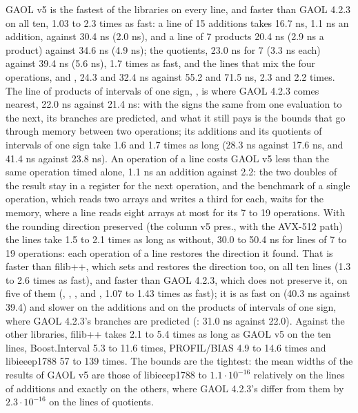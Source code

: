 GAOL v5 is the fastest of the libraries on every line, and faster than GAOL
4.2.3 on all ten, 1.03 to 2.3 times as fast: a line of 15 additions takes
16.7 ns, 1.1 ns an addition, against 30.4 ns (2.0 ns), and a line of 7
products 20.4 ns (2.9 ns a product) against 34.6 ns (4.9 ns); the quotients,
23.0 ns for 7 (3.3 ns each) against 39.4 ns (5.6 ns), 1.7 times as fast, and
the lines that mix the four operations,  and ,
24.3 and 32.4 ns against 55.2 and 71.5 ns, 2.3 and 2.2 times. The line of
products of intervals of one sign, , is where GAOL 4.2.3
comes nearest, 22.0 ns against 21.4 ns: with the signs the same from one
evaluation to the next, its branches are predicted, and what it still pays
is the bounds that go through memory between two operations; its additions
and its quotients of intervals of one sign take 1.6 and 1.7 times as long
(28.3 ns against 17.6 ns, and 41.4 ns against 23.8 ns). An operation of a
line costs GAOL v5 less than the same operation timed alone, 1.1 ns an
addition against 2.2: the two doubles of the result stay in a register for
the next operation, and the benchmark of a single operation, which reads two
arrays and writes a third for each, waits for the memory, where a line reads
eight arrays at most for its 7 to 19 operations. With the rounding direction
preserved (the column v5 pres.,  with the
AVX-512 path) the lines take 1.5 to 2.1 times as long as without, 30.0 to
50.4 ns for lines of 7 to 19 operations: each operation of a line restores
the direction it found. That is faster than filib++, which sets and
restores the direction too, on all ten lines (1.3 to 2.6 times as fast), and
faster than GAOL 4.2.3, which does not preserve it, on five of them
(, , ,  and
, 1.07 to 1.43 times as fast); it is as fast on 
(40.3 ns against 39.4) and slower on the additions and on the products of
intervals of one sign, where GAOL 4.2.3's branches are predicted
(: 31.0 ns against 22.0). Against the other libraries,
filib++ takes 2.1 to 5.4 times as long as GAOL v5 on the ten lines,
Boost.Interval 5.3 to 11.6 times, PROFIL/BIAS 4.9 to 14.6 times and
libieeep1788 57 to 139 times. The bounds are the tightest: the mean widths
of the results of GAOL v5 are those of libieeep1788 to $1.1\cdot10^{-16}$
relatively on the lines of additions and exactly on the others, where GAOL
4.2.3's differ from them by $2.3\cdot10^{-16}$ on the lines of quotients.

